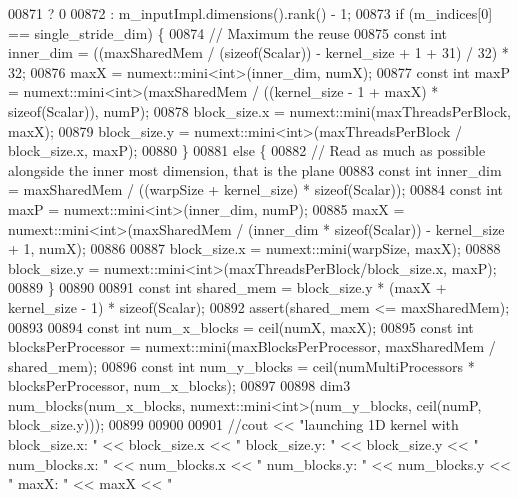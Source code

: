 \begin{DoxyCode}
00871                 ? 0
00872                 : m\_inputImpl.dimensions().rank() - 1;
00873         \textcolor{keywordflow}{if} (m\_indices[0] == single\_stride\_dim) \{
00874           \textcolor{comment}{// Maximum the reuse}
00875           \textcolor{keyword}{const} \textcolor{keywordtype}{int} inner\_dim = ((maxSharedMem / (\textcolor{keyword}{sizeof}(Scalar)) - kernel\_size + 1 + 31) / 32) * 32;
00876           maxX = numext::mini<int>(inner\_dim, numX);
00877           \textcolor{keyword}{const} \textcolor{keywordtype}{int} maxP = numext::mini<int>(maxSharedMem / ((kernel\_size - 1 + maxX) * \textcolor{keyword}{sizeof}(Scalar)), 
      numP);
00878           block\_size.x = numext::mini(maxThreadsPerBlock, maxX);
00879           block\_size.y = numext::mini<int>(maxThreadsPerBlock / block\_size.x, maxP);
00880         \}
00881         \textcolor{keywordflow}{else} \{
00882           \textcolor{comment}{// Read as much as possible alongside the inner most dimension, that is the plane}
00883           \textcolor{keyword}{const} \textcolor{keywordtype}{int} inner\_dim = maxSharedMem / ((warpSize + kernel\_size) * \textcolor{keyword}{sizeof}(Scalar));
00884           \textcolor{keyword}{const} \textcolor{keywordtype}{int} maxP = numext::mini<int>(inner\_dim, numP);
00885           maxX = numext::mini<int>(maxSharedMem / (inner\_dim * \textcolor{keyword}{sizeof}(Scalar)) - kernel\_size + 1, numX);
00886 
00887           block\_size.x = numext::mini(warpSize, maxX);
00888           block\_size.y = numext::mini<int>(maxThreadsPerBlock/block\_size.x, maxP);
00889         \}
00890 
00891         \textcolor{keyword}{const} \textcolor{keywordtype}{int} shared\_mem = block\_size.y * (maxX + kernel\_size - 1) * \textcolor{keyword}{sizeof}(Scalar);
00892         assert(shared\_mem <= maxSharedMem);
00893 
00894         \textcolor{keyword}{const} \textcolor{keywordtype}{int} num\_x\_blocks = ceil(numX, maxX);
00895         \textcolor{keyword}{const} \textcolor{keywordtype}{int} blocksPerProcessor = numext::mini(maxBlocksPerProcessor, maxSharedMem / shared\_mem);
00896         \textcolor{keyword}{const} \textcolor{keywordtype}{int} num\_y\_blocks = ceil(numMultiProcessors * blocksPerProcessor, num\_x\_blocks);
00897 
00898         dim3 num\_blocks(num\_x\_blocks, numext::mini<int>(num\_y\_blocks, ceil(numP, block\_size.y)));
00899 
00900 
00901         \textcolor{comment}{//cout << "launching 1D kernel with block\_size.x: " << block\_size.x << " block\_size.y: " <<
       block\_size.y << " num\_blocks.x: " << num\_blocks.x << " num\_blocks.y: " << num\_blocks.y << " maxX: " << maxX << "
}
\end{DoxyCode}
